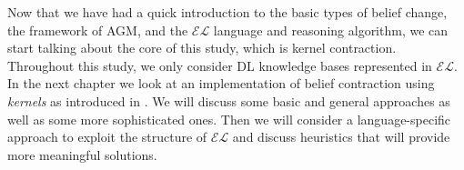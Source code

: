 Now that we have had a quick introduction to the basic types of belief change, the framework of AGM, and the $\mathcal{EL}$ language and reasoning algorithm, we can start talking about the core of this study, which is kernel contraction. Throughout this study, we only consider DL knowledge bases represented in $\mathcal{EL}$. In the next chapter we look at an implementation of belief contraction using \textit{kernels} as introduced in \cite{zwei}. We will discuss some basic and general approaches as well as some more sophisticated ones. Then we will consider a language-specific approach to exploit the structure of $\mathcal{EL}$ and discuss heuristics that will provide more meaningful solutions. 
